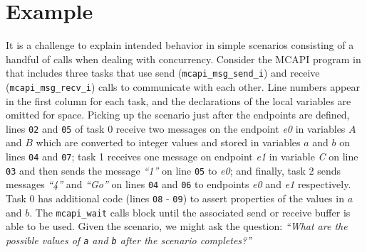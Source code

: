 \section{Example}

It is a challenge to explain intended behavior in simple scenarios
consisting of a handful of calls when dealing with concurrency. Consider
the MCAPI program in  that includes three
tasks that use send (\texttt{mcapi\_msg\_send\_i}) and receive
(\texttt{mcapi\_msg\_recv\_i}) calls to communicate with each other.
Line numbers appear in the first column for each task, and the
declarations of the local variables are omitted for space. Picking up
the scenario just after the endpoints are defined, lines \texttt{02}
and \texttt{05} of task 0 receive two messages on the endpoint
\textit{e0} in variables $A$ and $B$ which are
converted to integer values and stored in variables $a$ and
$b$ on lines \texttt{04} and \texttt{07}; task 1 receives one
message on endpoint \textit{e1} in variable \textit{C} on line
\texttt{03} and then sends the message \textit{``1''} on line \texttt{05} to
\textit{e0}; and finally, task 2 sends messages \textit{``4''} and \textit{``Go''} on
lines \texttt{04} and \texttt{06} to endpoints \textit{e0} and
\textit{e1} respectively. Task 0 has additional code (lines \texttt{08} -
\texttt{09}) to assert properties of the values in $a$ and
$b$. The \texttt{mcapi\_wait} calls block until the associated
send or receive buffer is able to be used. Given the scenario, we
might ask the question: \emph{``What are the possible values of
\texttt{a} and \texttt{b} after the scenario completes?''}





